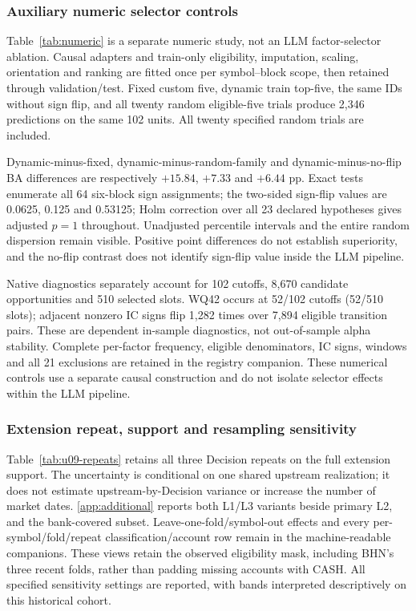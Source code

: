 \subsubsection{Auxiliary numeric selector controls}
Table~\ref{tab:numeric} is a separate numeric study, not an LLM factor-selector ablation. Causal adapters and train-only eligibility, imputation, scaling, orientation and ranking are fitted once per symbol--block scope, then retained through validation/test. Fixed custom five, dynamic train top-five, the same IDs without sign flip, and all twenty random eligible-five trials produce 2,346 predictions on the same 102 units. All twenty specified random trials are included.

Dynamic-minus-fixed, dynamic-minus-random-family and dynamic-minus-no-flip BA differences are respectively $+15.84$, $+7.33$ and $+6.44$ pp. Exact tests enumerate all 64 six-block sign assignments; the two-sided sign-flip values are 0.0625, 0.125 and 0.53125; Holm correction \cite{holm1979multiple} over all 23 declared hypotheses gives adjusted $p=1$ throughout. Unadjusted percentile intervals and the entire random dispersion remain visible. Positive point differences do not establish superiority, and the no-flip contrast does not identify sign-flip value inside the LLM pipeline.

Native diagnostics separately account for 102 cutoffs, 8,670 candidate opportunities and 510 selected slots. WQ42 occurs at 52/102 cutoffs (52/510 slots); adjacent nonzero IC signs flip 1,282 times over 7,894 eligible transition pairs. These are dependent in-sample diagnostics, not out-of-sample alpha stability. Complete per-factor frequency, eligible denominators, IC signs, windows and all 21 exclusions are retained in the registry companion. These numerical controls use a separate causal construction and do not isolate selector effects within the LLM pipeline.


\subsubsection{Extension repeat, support and resampling sensitivity}
Table~\ref{tab:u09-repeats} retains all three Decision repeats on the full extension support. The uncertainty is conditional on one shared upstream realization; it does not estimate upstream-by-Decision variance or increase the number of market dates. \ref{app:additional} reports both L1/L3 variants beside primary L2, and the bank-covered subset. Leave-one-fold/symbol-out effects and every per-symbol/fold/repeat classification/account row remain in the machine-readable companions. These views retain the observed eligibility mask, including BHN's three recent folds, rather than padding missing accounts with CASH. All specified sensitivity settings are reported, with bands interpreted descriptively on this historical cohort.
